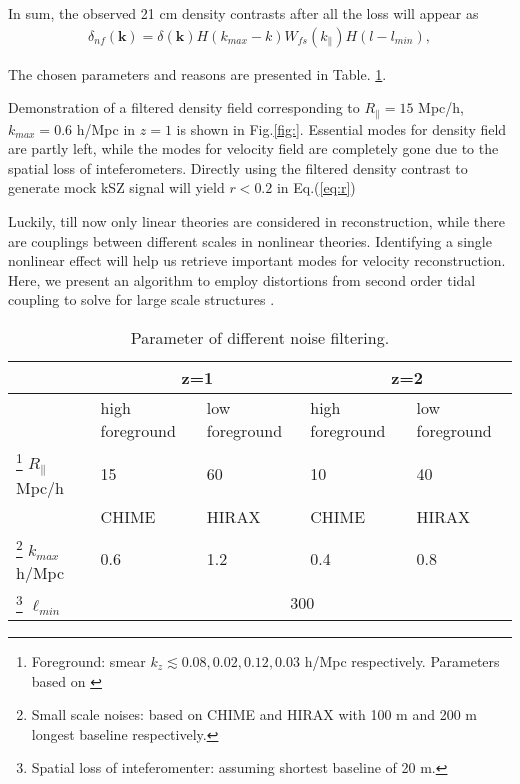 In sum, the observed 21 cm density contrasts after all the loss will appear as 
\begin{eqnarray}
\label{eq:ns}
    \delta_{nf}(\bm{k})=\delta(\bm{k})H(k_{max}-k)W_{fs}(k_\parallel)H(l-l_{min}),
\end{eqnarray}

The chosen parameters and reasons are presented in Table. \ref{tab:para}.

Demonstration of a filtered density field corresponding to 
$R_\parallel=15$ Mpc/h, $k_{max}=0.6$ h/Mpc 
in $z=1$ is shown in Fig.\ref{fig:}. 
Essential modes for density field are partly left,  
while the modes for velocity field are completely gone 
due to the spatial loss of inteferometers. 
Directly using the filtered density contrast to 
generate mock kSZ signal will yield $r<0.2$ in Eq.(\ref{eq:r}) 

Luckily, till now only linear theories are considered in reconstruction, 
while there are couplings between different scales in nonlinear theories. 
Identifying a single nonlinear effect will help 
us retrieve important modes for velocity reconstruction. 
Here, we present an algorithm to employ 
distortions from second order tidal coupling 
to solve for large scale structures 
\cite{2015:zhu,2012:pen}.  






\begin{table}
\begin{tabular}{|m{2cm}|m{1.5cm}|m{1.5cm}|m{1.5cm}|m{1.5cm}|}
    \hline
     & \multicolumn{2}{|c|}{z=1} &\multicolumn{2}{|c|}{z=2}\\
     \hline
     & high foreground &low foreground&high foreground& low foreground\\
     \cline{2-5}
     \footnote{Foreground: smear $k_z\lesssim 0.08,0.02,0.12,0.03$ h/Mpc respectively. Parameters based on \cite{2013ApJ...763L..20M,Switzer13,15Shaw}}
     $R_\parallel$ Mpc/h
      & 15 & 60 & 10 & 40 \\
     \hline
     & CHIME & HIRAX & CHIME &HIRAX\\
     \cline{2-5}
     \footnote{Small scale noises: based on CHIME\cite{2014CHIME} and HIRAX\cite{HIRAX} 
     with 100 m and 200 m longest baseline respectively.}
     $k_{max}$ h/Mpc 
     & 0.6 & 1.2 & 0.4 & 0.8 \\
     \hline
     \footnote{Spatial loss of inteferomenter: assuming shortest baseline of 20 m.}
     $\ell_{min}$
     & \multicolumn{4}{|c|}{300} \\
     \hline
\end{tabular}
     \caption{Parameter of different noise filtering.}
     \label{tab:para}
\end{table}
